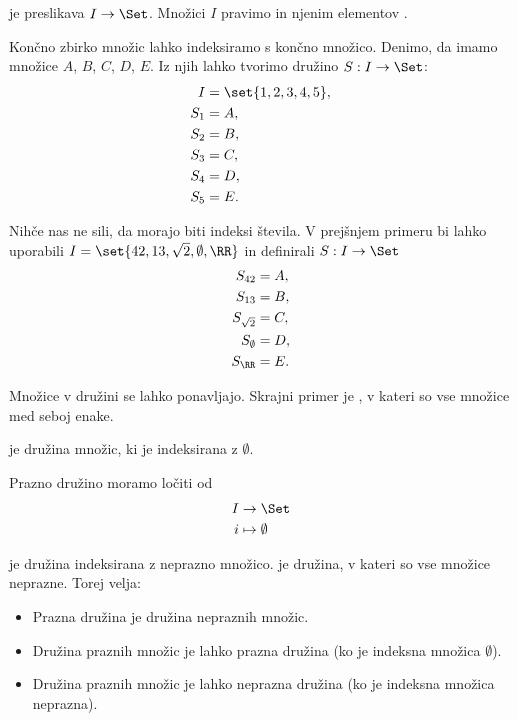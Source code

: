 \begin{definicija}
   je preslikava $I \to \Set$. Množici $I$ pravimo  in njenim elementov .
\end{definicija}


\begin{zgled}
  Končno zbirko množic lahko indeksiramo s končno množico. Denimo, da imamo
  množice $A$, $B$, $C$, $D$, $E$. Iz njih lahko tvorimo družino $S : I \to \Set$:
  \begin{align*}
  I &= \set{1, 2, 3, 4, 5}, \\
  S_1 &= A,\\
  S_2 &= B,\\
  S_3 &= C,\\
  S_4 &= D,\\
  S_5 &= E.
  \end{align*}
\end{zgled}

\begin{zgled}
  Nihče nas ne sili, da morajo biti indeksi števila. V prejšnjem primeru bi lahko
  uporabili $I = \set{42, 13, \sqrt{2}, \emptyset, \RR}$ in definirali $S : I \to \Set$
  \begin{align*}
  S_{42} &= A,\\
  S_{13} &= B,\\
  S_{\sqrt{2}} &= C,\\
  S_{\emptyset} &= D,\\
  S_{\RR} &= E.
  \end{align*}
\end{zgled}


\begin{zgled}
  Množice v družini se lahko ponavljajo. Skrajni primer je , v kateri so vse množice med seboj enake.
\end{zgled}

\begin{zgled}
   je družina množic, ki je indeksirana z $\emptyset$.
\end{zgled}

\begin{zgled}
  Prazno družino moramo ločiti od 
  \begin{align*}
    I &\to \Set \\
    i &\mapsto \emptyset
  \end{align*}
\end{zgled}

\begin{zgled}
   je družina indeksirana z neprazno množico.
   je družina, v kateri so vse množice neprazne.
  Torej velja:
  \begin{itemize}
  \item Prazna družina je družina nepraznih množic.
  \item Družina praznih množic je lahko prazna družina (ko je indeksna množica $\emptyset$).
  \item Družina praznih množic je lahko neprazna družina (ko je indeksna množica neprazna).
  \end{itemize}
\end{zgled}


